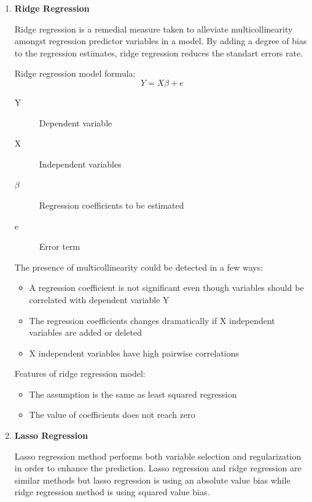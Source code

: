 \begin{enumerate}
    \item \textbf{Ridge Regression}
    
    Ridge regression is a remedial measure taken to alleviate multicollinearity amongst regression predictor variables in a model. By adding a degree of bias to the regression estimates, ridge regression reduces the standart errors rate. 
    
    Ridge regression model formula:
    \begin{equation}
     Y = X\beta + e
    \end{equation}
    \begin{description}
        \item[Y] Dependent variable 
        \item[X] Independent variables
        \item[$\beta$] Regression coefficients to be estimated
        \item[e] Error term
    \end{description}
    
    
    The presence of multicollinearity could be detected in a few ways:
    \begin{itemize}
        \item A regression coefficient is not significant even though variables should be correlated with dependent variable Y
        \item The regression coefficients changes dramatically if X independent variables are added or deleted
        \item X independent variables have high pairwise correlations
    \end{itemize}
    
    Features of ridge regression model:
    \begin{itemize}
        \item The assumption is the same as least squared regression
        \item The value of coefficients does not reach zero
    \end{itemize}
    
    
    \item \textbf{Lasso Regression}
    
    Lasso regression \cite{BIB7} method performs both variable selection and regularization in order to enhance the prediction. Lasso regression and ridge regression are similar methods but lasso regression is using an absolute value bias while ridge regression method is using squared value bias.
    

\end{enumerate}
